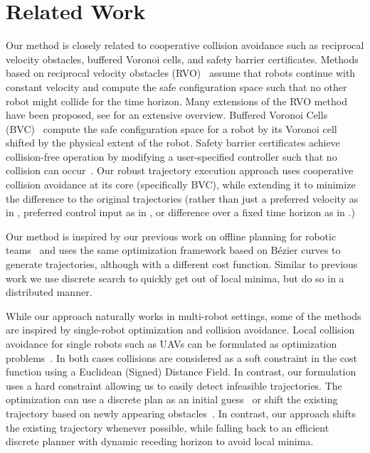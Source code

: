 \documentclass{svproc}
\begin{document}
\section{Related Work}
\label{sec:relatedWork}
Our method is closely related to cooperative collision avoidance such as reciprocal velocity obstacles, buffered Voronoi cells, and safety barrier certificates.
Methods based on reciprocal velocity obstacles (RVO)~\cite{RVO} assume that robots continue with constant velocity and compute the safe configuration space such that no other robot might collide for the time horizon.
Many extensions of the RVO method have been proposed, see \cite{epsilonCCA} for an extensive overview.
Buffered Voronoi Cells (BVC)~\cite{bufferedVoronoiCells} compute the safe configuration space for a robot by its Voronoi cell shifted by the physical extent of the robot. 
Safety barrier certificates achieve collision-free operation by modifying a user-specified controller such that no collision can occur~\cite{barrierCertificates}.
Our robust trajectory execution approach uses cooperative collision avoidance at its core (specifically BVC), while extending it to minimize the difference to the original trajectories (rather than just a preferred velocity as in \cite{epsilonCCA}, preferred control input as in \cite{barrierCertificates}, or difference over a fixed time horizon as in \cite{bufferedVoronoiCells}.)

Our method is inspired by our previous work on offline planning for robotic teams~\cite{crazyplanning-ieeetro} and uses the same optimization framework based on B\'ezier curves to generate trajectories, although with a different cost function.
Similar to previous work we use discrete search to quickly get out of local minima, but do so in a distributed manner.

While our approach naturally works in multi-robot settings, some of the methods are inspired by single-robot optimization and collision avoidance.
Local collision avoidance for single robots such as UAVs can be formulated as optimization problems~\cite{replanning-eth,replanning-usenko}.
In both cases collisions are considered as a soft constraint in the cost function using a Euclidean (Signed) Distance Field.
In contrast, our formulation uses a hard constraint allowing us to easily detect infeasible trajectories.
The optimization can use a discrete plan as an initial guess~\cite{replanning-eth} or shift the existing trajectory based on newly appearing obstacles~\cite{replanning-usenko}.
In contrast, our approach shifts the existing trajectory whenever possible, while falling back to an efficient discrete planner with dynamic receding horizon to avoid local minima.
\end{document}
